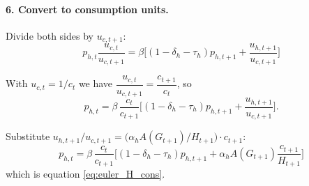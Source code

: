 \paragraph{6. Convert to consumption units.}
Divide both sides by $u_{c,t+1}$:
\[
p_{h,t}\frac{u_{c,t}}{u_{c,t+1}}
=
\beta\Big[
(1-\delta_h-\tau_h)p_{h,t+1} + \frac{u_{h,t+1}}{u_{c,t+1}}
\Big]
\]

With $u_{c,t}=1/c_t$ we have $\dfrac{u_{c,t}}{u_{c,t+1}}=\dfrac{c_{t+1}}{c_t}$, so
\[
p_{h,t}
=
\beta\,\frac{c_t}{c_{t+1}}
\Big[
(1-\delta_h-\tau_h)p_{h,t+1} + \frac{u_{h,t+1}}{u_{c,t+1}}
\Big].
\]

Substitute $u_{h,t+1}/u_{c,t+1}
= \bigl(\alpha_h A(G_{t+1})/H_{t+1}\bigr) \cdot c_{t+1}$:
\[
p_{h,t}
=
\beta\,\frac{c_t}{c_{t+1}}
\Big[
(1-\delta_h-\tau_h)p_{h,t+1}
+ \alpha_h A(G_{t+1})\frac{c_{t+1}}{H_{t+1}}
\Big]
\]
which is equation \eqref{eq:euler_H_cons}.



